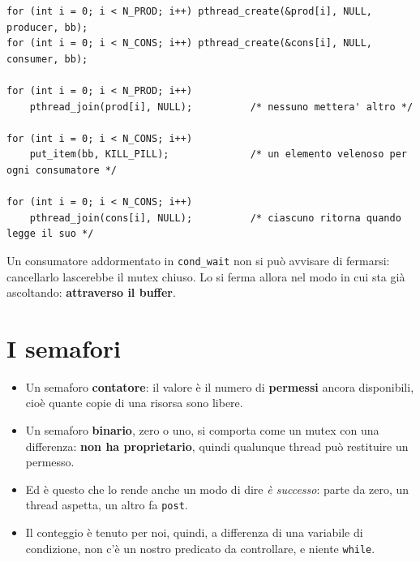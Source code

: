 \begin{lstlisting}[language={[POSIX]C}, style=wnumbers, title={La pillola avvelenata}]
for (int i = 0; i < N_PROD; i++) pthread_create(&prod[i], NULL, producer, bb);
for (int i = 0; i < N_CONS; i++) pthread_create(&cons[i], NULL, consumer, bb);

for (int i = 0; i < N_PROD; i++)
    pthread_join(prod[i], NULL);          /* nessuno mettera' altro */

for (int i = 0; i < N_CONS; i++)
    put_item(bb, KILL_PILL);              /* un elemento velenoso per ogni consumatore */

for (int i = 0; i < N_CONS; i++)
    pthread_join(cons[i], NULL);          /* ciascuno ritorna quando legge il suo */
\end{lstlisting}

Un consumatore addormentato in \texttt{cond\_wait} non si può avvisare di fermarsi: cancellarlo lascerebbe il mutex chiuso.
Lo si ferma allora nel modo in cui sta già ascoltando: \textbf{attraverso il buffer}.

\section{I semafori}


\begin{itemize}
    \item Un semaforo \textbf{contatore}: il valore è il numero di \textbf{permessi} ancora disponibili, cioè quante copie di
          una risorsa sono libere.
    \item Un semaforo \textbf{binario}, zero o uno, si comporta come un mutex con una differenza: \textbf{non ha
          proprietario}, quindi qualunque thread può restituire un permesso.
    \item Ed è questo che lo rende anche un modo di dire \emph{è successo}: parte da zero, un thread aspetta, un altro fa
          \texttt{post}.
    \item Il conteggio è tenuto per noi, quindi, a differenza di una variabile di condizione, non c'è un nostro predicato da
          controllare, e niente \texttt{while}.
\end{itemize}


